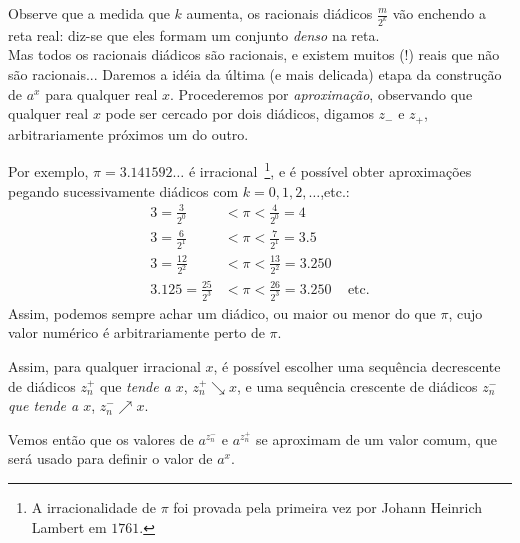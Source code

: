 Observe que a medida que $k$ aumenta, 
os racionais diádicos $\tfrac{m}{2^k}$ vão enchendo a
reta real: diz-se que eles
formam um conjunto \emph{denso} na reta.\\

Mas todos os racionais diádicos são racionais, e existem muitos (!) reais que
não são racionais...
Daremos a idéia da última (e mais delicada) etapa da construção de $a^x$ para
qualquer real $x$. Procederemos por \emph{aproximação}, observando que
qualquer real $x$ pode ser cercado por dois diádicos, digamos $z_-$ e $z_+$,
arbitrariamente próximos um do outro.
\begin{ex}
Por exemplo, $\pi=3.141592\dots$ é irracional~\footnote{A irracionalidade de
$\pi$ foi provada pela primeira vez por Johann Heinrich Lambert em $1761$.}, 
e é possível obter
aproximações pegando sucessivamente diádicos com $k=0,1,2,\dots$,etc.:
\begin{align*}
3=\frac{3}{2^0}& <\pi < \frac{4}{2^0}=4\\
3=\frac{6}{2^1}& <\pi < \frac{7}{2^1}=3.5\\
3=\frac{12}{2^2}& <\pi < \frac{13}{2^2}=3.250\\
3.125=\frac{25}{2^3}& <\pi < \frac{26}{2^3}=3.250\,\quad \text{etc.}
\end{align*}
Assim, podemos sempre achar um diádico, ou maior ou menor do que $\pi$, cujo valor
numérico é arbitrariamente perto de $\pi$.
\end{ex}

Assim, para qualquer irracional $x$, é possível escolher uma
sequência decrescente de diádicos $z_n^+$ que \emph{tende a $x$}, 
$z_n^+\searrow x$, e uma sequência crescente de diádicos $z_n^-$ 
\emph{que tende a $x$}, $z_n^-\nearrow x$. 

\begin{center}
\begin{bmlimage}\end{bmlimage}
\end{center}
Vemos então que os valores de $a^{z_n^-}$ e $a^{z_n^+}$ se aproximam de um
valor comum, que será usado para definir o valor de $a^x$.

